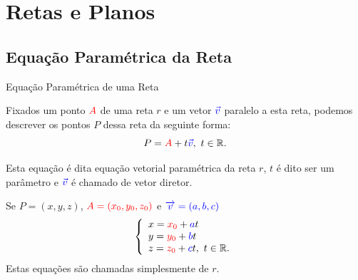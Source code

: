 \section{Retas e Planos}

\subsection*{Equação Paramétrica da Reta}


\begin{frame}[label=retas]{Equação Paramétrica de uma Reta}

Fixados um ponto ${\color{red} A}$ de uma reta $r$ e um vetor ${\color{blue}\vec{v}}$ paralelo a esta reta, podemos descrever os pontos $P$ dessa reta da seguinte forma:
\[P={\color{red}A}+t{\color{blue}\vec{v}},\ t\in \mathbb{R}.\]
	\begin{center}
	\end{center}
	
Esta equação é dita {\color{blue} equação vetorial paramétrica da reta $r$}, $t$ é dito ser um {\color{blue}parâmetro} e ${\color{blue}\vec{v}}$ é chamado de {\color{blue}vetor diretor.}

\end{frame}

\begin{frame}[label=retas]
Se 	$P=(x,y,z)$, $\textcolor{red}{A=(x_0,y_0,z_0)}$ e $\textcolor{blue}{\overrightarrow{v}=(a,b,c)}$
		\[	\left\{\begin{array}{l}
		x=\textcolor{red}{x_0}+\textcolor{blue}{a}t\\
		y=\textcolor{red}{y_0}+\textcolor{blue}{b}t\\
		z=\textcolor{red}{z_0}+\textcolor{blue}{c}t,\  t\in \mathbb{R}.
		\end{array}\right.\]
		Estas equações são chamadas simplesmente de  $r$.
\end{frame}

